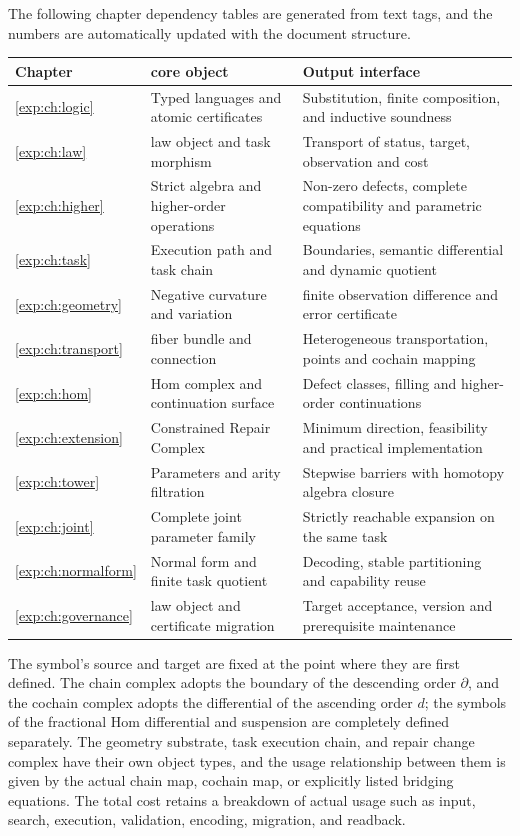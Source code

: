 \documentclass[12pt,a4paper,openany,notitlepage]{report}
\theoremstyle{plain}
\theoremstyle{definition}
\theoremstyle{remark}
\begin{document}
\begin{CJK*}
The following chapter dependency tables are generated from text tags, and the numbers are automatically updated with the document structure.\begin{center}
\small\begin{tabularx}
{\textwidth}{P{.13\textwidth}P{.32\textwidth}Y}\toprule
Chapter&
core object&
Output interface\\
\midrule
\ref{exp:ch:logic}&
Typed languages and atomic certificates&
Substitution, finite composition, and inductive soundness\\
\ref{exp:ch:law}&
law object and task morphism&
Transport of status, target, observation and cost\\
\ref{exp:ch:higher}&
Strict algebra and higher-order operations&
Non-zero defects, complete compatibility and parametric equations\\
\ref{exp:ch:task}&
Execution path and task chain&
Boundaries, semantic differential and dynamic quotient\\
\ref{exp:ch:geometry}&
Negative curvature and variation&
finite observation difference and error certificate\\
\ref{exp:ch:transport}&
fiber bundle and connection&
Heterogeneous transportation, points and cochain mapping\\
\ref{exp:ch:hom}&
Hom complex and continuation surface&
Defect classes, filling and higher-order continuations\\
\ref{exp:ch:extension}&
Constrained Repair Complex&
Minimum direction, feasibility and practical implementation\\
\ref{exp:ch:tower}&
Parameters and arity filtration&
Stepwise barriers with homotopy algebra closure\\
\ref{exp:ch:joint}&
Complete joint parameter family&
Strictly reachable expansion on the same task\\
\ref{exp:ch:normalform}&
Normal form and finite task quotient&
Decoding, stable partitioning and capability reuse\\
\ref{exp:ch:governance}&
law object and certificate migration&
Target acceptance, version and prerequisite maintenance\\
\bottomrule
\end{tabularx}
\end{center}


The symbol's source and target are fixed at the point where they are first defined. The chain complex adopts the boundary of the descending order $\partial$, and the cochain complex adopts the differential of the ascending order $d$; the symbols of the fractional Hom differential and suspension are completely defined separately. The geometry substrate, task execution chain, and repair change complex have their own object types, and the usage relationship between them is given by the actual chain map, cochain map, or explicitly listed bridging equations. The total cost retains a breakdown of actual usage such as input, search, execution, validation, encoding, migration, and readback.


\end{CJK*}
\end{document}

